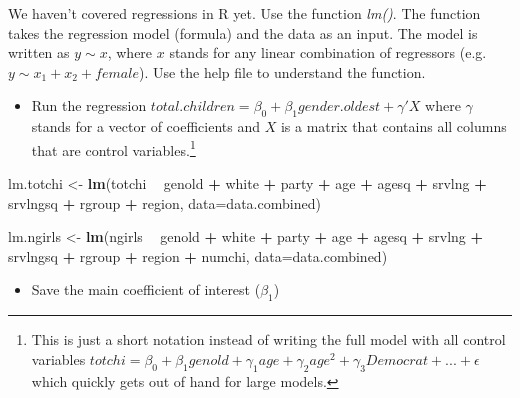 \documentclass[
]{article}
\newenvironment{Shaded}{\begin{snugshade}}{\end{snugshade}}
\newcommand{\DataTypeTok}[1]{\textcolor[rgb]{0.13,0.29,0.53}{#1}}
\newcommand{\KeywordTok}[1]{\textcolor[rgb]{0.13,0.29,0.53}{\textbf{#1}}}
\newcommand{\NormalTok}[1]{#1}
\newcommand{\OperatorTok}[1]{\textcolor[rgb]{0.81,0.36,0.00}{\textbf{#1}}}
\newcommand{\StringTok}[1]{\textcolor[rgb]{0.31,0.60,0.02}{#1}}
\providecommand{\tightlist}{%
  \setlength{\itemsep}{0pt}\setlength{\parskip}{0pt}}
\begin{document}
We haven't covered regressions in R yet. Use the function \emph{lm()}.
The function takes the regression model (formula) and the data as an
input. The model is written as \(y \sim x\), where \(x\) stands for any
linear combination of regressors (e.g.~\(y \sim x_1 + x_2 + female\)).
Use the help file to understand the function.

\begin{itemize}
\tightlist
\item
  Run the regression
  \(total.children = \beta_0 + \beta_1 gender.oldest + \gamma'X\) where
  \(\gamma\) stands for a vector of coefficients and \(X\) is a matrix
  that contains all columns that are control
  variables.\footnote{This is just a short notation instead of writing the full model with all control variables $totchi = \beta_0 + \beta_1 genold + \gamma_1 age + \gamma_2 age^2 + \gamma_3 Democrat + ... + \epsilon$ which quickly gets out of hand for large models.}
\end{itemize}

\begin{Shaded}
\begin{Highlighting}[]
\NormalTok{lm.totchi <-}\StringTok{ }\KeywordTok{lm}\NormalTok{(totchi }\OperatorTok{~}\StringTok{ }\NormalTok{genold }\OperatorTok{+}\StringTok{ }\NormalTok{white }\OperatorTok{+}\StringTok{ }\NormalTok{party }\OperatorTok{+}\StringTok{ }\NormalTok{age }\OperatorTok{+}\StringTok{ }\NormalTok{agesq }\OperatorTok{+}\StringTok{ }\NormalTok{srvlng }\OperatorTok{+}\StringTok{ }\NormalTok{srvlngsq }\OperatorTok{+}\StringTok{ }\NormalTok{rgroup }\OperatorTok{+}\StringTok{ }\NormalTok{region, }\DataTypeTok{data=}\NormalTok{data.combined)}



\NormalTok{lm.ngirls <-}\StringTok{ }\KeywordTok{lm}\NormalTok{(ngirls }\OperatorTok{~}\StringTok{ }\NormalTok{genold }\OperatorTok{+}\StringTok{ }\NormalTok{white }\OperatorTok{+}\StringTok{ }\NormalTok{party }\OperatorTok{+}\StringTok{ }\NormalTok{age }\OperatorTok{+}\StringTok{ }\NormalTok{agesq }\OperatorTok{+}\StringTok{ }\NormalTok{srvlng }\OperatorTok{+}\StringTok{ }\NormalTok{srvlngsq }\OperatorTok{+}\StringTok{ }\NormalTok{rgroup }\OperatorTok{+}\StringTok{ }\NormalTok{region }\OperatorTok{+}\StringTok{ }\NormalTok{numchi, }\DataTypeTok{data=}\NormalTok{data.combined)}
\end{Highlighting}
\end{Shaded}

\begin{itemize}
\tightlist
\item
  Save the main coefficient of interest (\(\beta_1\))
\end{itemize}
\end{document}
